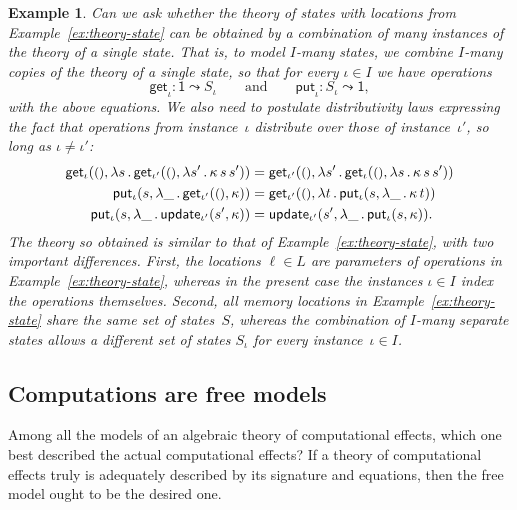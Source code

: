 \documentclass{amsart}
\newcommand{\lam}[1]{\lambda #1 \,.\,}
\newcommand{\opdecl}[3]{#1 : #2 \leadsto #3} %
\newcommand{\one}{\mathsf{1}} %
\newcommand{\unit}{{\text{\small$()$}}} %
\newcommand{\kode}[1]{\mathsf{#1}}
\newcommand{\opcall}[3]{\kode{#1}(#2, #3)}
\newtheorem{example}{Example}[section]
\begin{document}
\begin{example}
  Can we ask whether the theory of states with locations from
  Example~\ref{ex:theory-state} can be obtained by a combination of many
  instances of the theory of a single state. That is, to model $I$-many states,
  we combine $I$-many copies of the theory of a single state, so that for every
  $\iota \in I$ we have operations
  \begin{equation*}
    \opdecl{\kode{get}_\iota}{\one}{S_\iota}
    \qquad\text{and}\qquad
    \opdecl{\kode{put}_\iota}{S_\iota}{\one},
  \end{equation*}
  with the above equations. We also need to postulate \emph{distributivity} laws
  expressing the fact that operations from instance~$\iota$ distribute over
  those of instance~$\iota'$, so long as $\iota \neq \iota'$:
  \begin{align*}
    \opcall{get_\iota}{\unit}{
       \lam{s} \opcall{get_{\iota'}}{\unit}{\lam{s'} \kappa \, s \, s'}
    } &=
    \opcall{get_{\iota'}}{\unit}{
       \lam{s'} \opcall{get_\iota}{\unit}{\lam{s} \kappa \, s \, s'}
    }
    \\
    \opcall{put_\iota}{s}{
       \lam{\_} \opcall{get_{\iota'}}{\unit}{\kappa}
    } &=
    \opcall{get_{\iota'}}{\unit}{
       \lam{t} \opcall{put_\iota}{s}{
          \lam{\_} \kappa \, t
       }
    } \\
    \opcall{put_\iota}{s}{
       \lam{\_} \opcall{update_{\iota'}}{s'}{\kappa}
    } &=
    \opcall{update_{\iota'}}{s'}{
       \lam{\_} \opcall{put_\iota}{s}{\kappa}
    }.
  \end{align*}
  The theory so obtained is similar to that of Example~\ref{ex:theory-state},
  with two important differences. First, the locations $\ell \in L$ are
  parameters of operations in Example~\ref{ex:theory-state}, whereas in the
  present case the instances $\iota \in I$ index the operations themselves.
  Second, all memory locations in Example~\ref{ex:theory-state} share the same
  set of states~$S$, whereas the combination of $I$-many separate states allows
  a different set of states $S_\iota$ for every instance~$\iota \in I$.
\end{example}

\subsection{Computations are free models}
\label{sec:comp-are-free}

Among all the models of an algebraic theory of computational effects, which one
best described the actual computational effects? If a theory of computational
effects truly is adequately described by its signature and equations, then the
free model ought to be the desired one.
\end{document}
